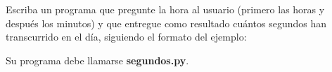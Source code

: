 \documentclass[12pt,spanish,letterpaper]{article}
\begin{document}
  Escriba un programa que pregunte la hora al usuario
  (primero las horas y después los minutos)
  y que entregue como resultado
  cuántos segundos han transcurrido en el día,
  siguiendo el formato del ejemplo:

  \begin{minipage}[t]{.5\textwidth}
    
  \end{minipage}

  Su programa debe llamarse \textbf{segundos.py}.
\end{document}

